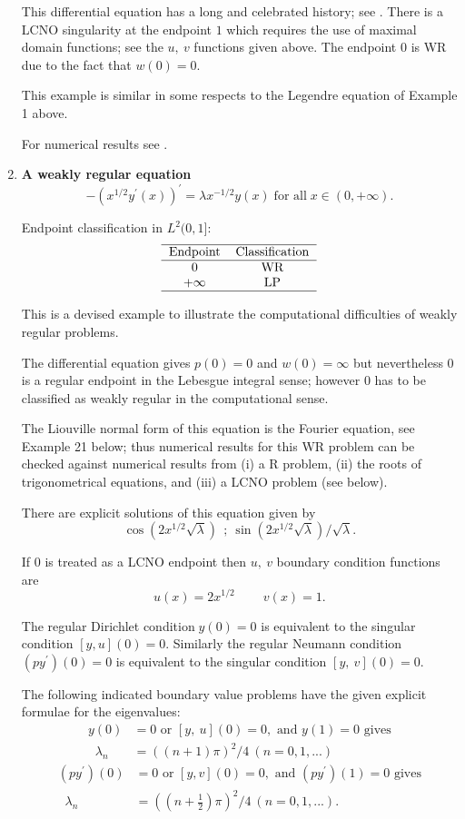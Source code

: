 \documentclass[12pt]{amsart}%
\theoremstyle{plain}
\numberwithin{equation}{section}
\begin{document}
\begin{enumerate}
This differential equation has a long and celebrated history; see \cite[Pages
43 to 45]{F}. There is a LCNO singularity at the endpoint $1$ which requires
the use of maximal domain functions; see the $u,\ v$ functions given above.
The endpoint $0$ is WR due to the fact that $w(0)=0$.

This example is similar in some respects to the Legendre equation of Example 1 above.

For numerical results see \cite[Example 7]{BEZ}.

\item \textbf{A weakly regular equation}%
\[
-(x^{1/2}y^{\prime}(x))^{\prime}=\lambda x^{-1/2}y(x)\;\text{for all}%
\;x\in(0,+\infty).
\]

Endpoint classification in $L^{2}(0,1]$:%
\[%
\begin{tabular}
[c]{cc}\hline
Endpoint & Classification\\\hline
$0$ & WR\\
$+\infty$ & LP\\\hline
\end{tabular}
\]

This is a devised example to illustrate the computational difficulties of
weakly regular problems.

The differential equation gives $p(0)=0$ and $w(0)=\infty$ but nevertheless
$0$ is a regular endpoint in the Lebesgue integral sense; however $0$ has to
be classified as weakly regular in the computational sense.

The Liouville normal form of this equation is the Fourier equation, see
Example 21 below; thus numerical results for this WR problem can be checked
against numerical results from (i) a R problem, (ii) the roots of
trigonometrical equations, and (iii) a LCNO problem (see below).

There are explicit solutions of this equation given by%
\[
\cos(2x^{1/2}\surd\lambda)\ \ ;\ \sin(2x^{1/2}\surd\lambda)/\surd\lambda.
\]

If $0$ is treated as a LCNO endpoint then $u,\ v$ boundary condition functions
are%
\[
u(x)=2x^{1/2}\quad\quad\ v(x)=1.
\]

The regular Dirichlet condition$\;y(0)=0$ is equivalent to the singular
condition $[y,u](0)=0$. Similarly the regular Neumann condition $(py^{\prime
})(0)=0$ is equivalent to the singular condition $[y,\ v](0)=0$.

The following indicated boundary value problems have the given explicit
formulae for the eigenvalues:
\begin{align*}
y(0)  &  =0\text{{ or }}[y,\ u](0)=0,\text{{ and }}y(1)=0\text{ gives}\\
\;\;\lambda_{n}  &  =((n+1)\pi)^{2}/4\ (n=0,1,...)
\end{align*}%
\begin{align*}
(py^{\prime})(0)  &  =0\text{{ or }}[y,v](0)=0,\text{{ and }}(py^{\prime
})(1)=0\text{ gives}\\
\;\;\lambda_{n}  &  =\left(  (n+\tfrac{1}{2})\pi\right)  ^{2}/4\ (n=0,1,...).
\end{align*}


\end{enumerate}
\end{document}

